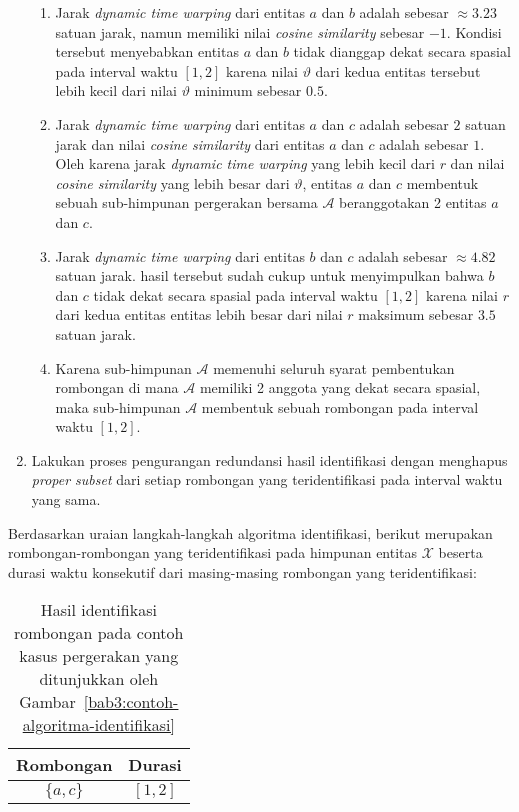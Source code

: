 \begin{enumerate}
    \begin{enumerate}
        \item Jarak \textit{dynamic time warping} dari entitas $a$ dan $b$ adalah sebesar $\approx 3.23$ satuan jarak, namun memiliki nilai \textit{cosine similarity} sebesar $-1$. Kondisi tersebut menyebabkan entitas $a$ dan $b$ tidak dianggap dekat secara spasial pada interval waktu $[1, 2]$ karena nilai $\vartheta$ dari kedua entitas tersebut lebih kecil dari nilai $\vartheta$ minimum sebesar $0.5$.
        \item Jarak \textit{dynamic time warping} dari entitas $a$ dan $c$ adalah sebesar $2$ satuan jarak dan nilai \textit{cosine similarity} dari entitas $a$ dan $c$ adalah sebesar $1$. Oleh karena jarak \textit{dynamic time warping} yang lebih kecil dari $r$ dan nilai \textit{cosine similarity} yang lebih besar dari $\vartheta$, entitas $a$ dan $c$ membentuk sebuah sub-himpunan pergerakan bersama $\mathcal{A}$ beranggotakan 2 entitas $a$ dan $c$.
        \item Jarak \textit{dynamic time warping} dari entitas $b$ dan $c$ adalah sebesar $\approx 4.82$ satuan jarak. hasil tersebut sudah cukup untuk menyimpulkan bahwa $b$ dan $c$ tidak dekat secara spasial pada interval waktu $[1, 2]$ karena nilai $r$ dari kedua entitas entitas lebih besar dari nilai $r$ maksimum sebesar $3.5$ satuan jarak.
        \item Karena sub-himpunan $\mathcal{A}$ memenuhi seluruh syarat pembentukan rombongan di mana $\mathcal{A}$ memiliki 2 anggota yang dekat secara spasial, maka sub-himpunan $\mathcal{A}$ membentuk sebuah rombongan pada interval waktu $[1, 2]$.
    \end{enumerate}
    
    \item Lakukan proses pengurangan redundansi hasil identifikasi dengan menghapus \textit{proper subset} dari setiap rombongan yang teridentifikasi pada interval waktu yang sama.
\end{enumerate}

\clearpage

Berdasarkan uraian langkah-langkah algoritma identifikasi, berikut merupakan rombongan-rombongan yang teridentifikasi pada himpunan entitas $\mathcal{X}$ beserta durasi waktu konsekutif dari masing-masing rombongan yang teridentifikasi:

\begin{table}[h]
    \centering
    \captionsetup{width=0.6\textwidth}
    \caption{Hasil identifikasi rombongan pada contoh kasus pergerakan yang ditunjukkan oleh Gambar~\ref{bab3:contoh-algoritma-identifikasi}}
    \begin{tabular}{|c|c|}
        \hline
        Rombongan & Durasi \\
        \hline
        $\{ a, c \}$ & $[1, 2]$ \\
        \hline
    \end{tabular}
    \label{bab6:contoh-identifikasi-non-redundan}
\end{table}

